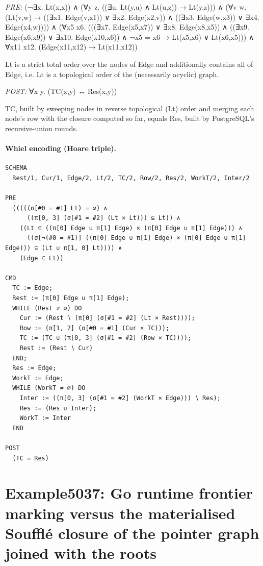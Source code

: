 \documentclass[10pt]{article}
\begin{document}
\textit{PRE:} (¬∃x. Lt(x,x)) ∧ (∀y z. ((∃u. Lt(y,u) ∧ Lt(u,z)) → Lt(y,z))) ∧ (∀v w. (Lt(v,w) → ((∃x1. Edge(v,x1)) ∨ ∃x2. Edge(x2,v)) ∧ ((∃x3. Edge(w,x3)) ∨ ∃x4. Edge(x4,w)))) ∧ (∀x5 x6. (((∃x7. Edge(x5,x7)) ∨ ∃x8. Edge(x8,x5)) ∧ ((∃x9. Edge(x6,x9)) ∨ ∃x10. Edge(x10,x6)) ∧ ¬x5 = x6 → Lt(x5,x6) ∨ Lt(x6,x5))) ∧ ∀x11 x12. (Edge(x11,x12) → Lt(x11,x12))\par Lt is a strict total order over the nodes of Edge and additionally contains all of Edge, i.e. Lt is a topological order of the (necessarily acyclic) graph.

\textit{POST:} ∀x y. (TC(x,y) ↔ Res(x,y))\par TC, built by sweeping nodes in reverse topological (Lt) order and merging each node's row with the closure computed so far, equals Res, built by PostgreSQL's recursive-union rounds.

\paragraph{Whiel encoding (Hoare triple).}

\begin{Verbatim}[fontsize=\scriptsize,breaklines=true,breakanywhere=true,frame=single,framesep=1.5mm]
SCHEMA
  Rest/1, Cur/1, Edge/2, Lt/2, TC/2, Row/2, Res/2, WorkT/2, Inter/2

PRE
  (((((σ[#0 = #1] Lt) = ∅) ∧
      ((π[0, 3] (σ[#1 = #2] (Lt × Lt))) ⊆ Lt)) ∧
    ((Lt ⊆ ((π[0] Edge ∪ π[1] Edge) × (π[0] Edge ∪ π[1] Edge))) ∧
      ((σ[¬(#0 = #1)] ((π[0] Edge ∪ π[1] Edge) × (π[0] Edge ∪ π[1] Edge))) ⊆ (Lt ∪ π[1, 0] Lt)))) ∧
    (Edge ⊆ Lt))

CMD
  TC := Edge;
  Rest := (π[0] Edge ∪ π[1] Edge);
  WHILE (Rest ≠ ∅) DO
    Cur := (Rest ∖ (π[0] (σ[#1 = #2] (Lt × Rest))));
    Row := (π[1, 2] (σ[#0 = #1] (Cur × TC)));
    TC := (TC ∪ (π[0, 3] (σ[#1 = #2] (Row × TC))));
    Rest := (Rest ∖ Cur)
  END;
  Res := Edge;
  WorkT := Edge;
  WHILE (WorkT ≠ ∅) DO
    Inter := ((π[0, 3] (σ[#1 = #2] (WorkT × Edge))) ∖ Res);
    Res := (Res ∪ Inter);
    WorkT := Inter
  END

POST
  (TC = Res)
\end{Verbatim}

\Needspace{0.45\textheight}

\section{Example5037: Go runtime frontier marking versus the materialised Soufflé closure of the pointer graph joined with the roots}\label{case:Example5037}
\end{document}
